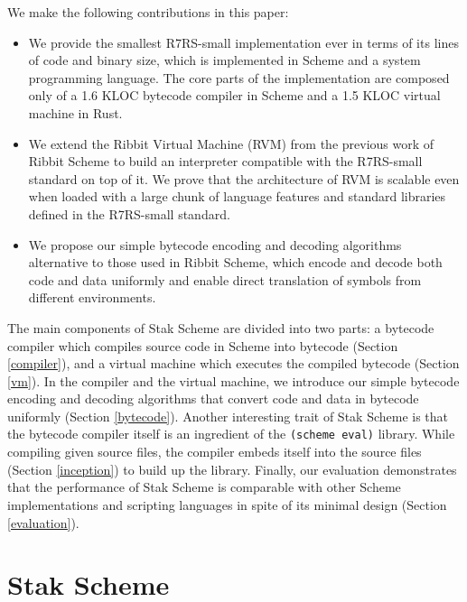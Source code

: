 \documentclass[sigplan, anonymous, review]{acmart}
\begin{document}
We make the following contributions in this paper:

\begin{itemize}
  \item We provide the smallest R7RS-small implementation ever in
    terms of its lines of code and binary size, which is implemented
    in Scheme and a system programming language.
    The core parts of the implementation are composed only of a 1.6 KLOC
    bytecode compiler in Scheme and a 1.5 KLOC virtual machine in Rust.
  \item We extend the Ribbit Virtual Machine (RVM) from the previous
    work of Ribbit Scheme to build an interpreter compatible with the
    R7RS-small standard on top of it.
    We prove that the architecture of RVM is scalable even when
    loaded with a large chunk of language features and standard
    libraries defined in the R7RS-small standard.
  \item We propose our simple bytecode encoding and decoding algorithms
    alternative to those used in Ribbit Scheme, which encode and
    decode both code and data uniformly and enable direct translation
    of symbols from different environments.
\end{itemize}

The main components of Stak Scheme are divided into two parts:
a bytecode compiler which compiles source code in Scheme into
bytecode (Section \ref{compiler}),
and a virtual machine which executes the compiled bytecode
(Section \ref{vm}).
In the compiler and the virtual machine, we introduce our simple
bytecode encoding and
decoding algorithms that convert code and data in bytecode
uniformly (Section \ref{bytecode}).
Another interesting trait of Stak Scheme is that the bytecode compiler itself
is an ingredient of the \texttt{(scheme eval)} library.
While compiling given source files, the compiler embeds itself
into the source files (Section \ref{inception}) to build up the library.
Finally, our evaluation demonstrates that the performance of Stak Scheme is
comparable with other Scheme implementations and scripting
languages in spite of its minimal design (Section \ref{evaluation}).

\section{Stak Scheme}
\end{document}
